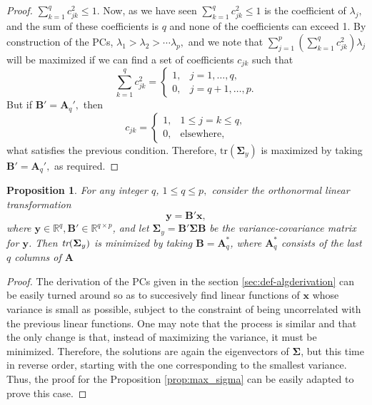 \documentclass[11pt, oneside]{book}
\theoremstyle{plain}
\newtheorem{prop}{Proposition}[section]
\theoremstyle{remark}
\begin{document}
\begin{proof}
    $\sum_{k=1}^qc_{jk}^2\leq 1.$ Now, as we have seen $\sum_{k=1}^qc_{jk}^2\leq
    1$ is the coefficient of $\lambda_j,$ and the sum of these coefficients is
    $q$ and none of the coefficients can exceed 1. By construction of the PCs, 
    $\lambda_1>\lambda_2>\cdots\lambda_p,$ and we note that
    $\sum_{j=1}^p\left(\sum_{k=1}^qc_{jk}^2\right)\lambda_j$ will be maximized
    if we can find a set of coefficients $c_{jk}$ such that
    $$\sum_{k=1}^qc_{jk}^2 = 
    \begin{cases}
        1, & j=1,\dots,q,\\
        0, & j=q+1,\dots,p.
    \end{cases}$$ But if $\mathbf{B'} = \mathbf{A}_q',$ then
    $$c_{jk} =
    \begin{cases}
        1, & 1\leq j=k\leq q,\\
        0, & \text{elsewhere},
    \end{cases}$$ what satisfies the previous condition. Therefore,
    $\text{tr}(\mathbf{\Sigma}_y)$ is maximized by taking $\mathbf{B'} =
    \mathbf{A}_q',$ as required. 
\end{proof}    
\begin{prop}\label{prop:min_sigma}
    For any integer $q$, $1\leq q\leq p,$ consider the orthonormal linear
    transformation $$\mathbf{y} = \mathbf{B'x},$$ where
    $\mathbf{y}\in\mathbb{R}^q, \mathbf{B'}\in\mathbb{R}^{q\times p}$, and let
    $\mathbf{\Sigma}_y = \mathbf{B'\Sigma B}$ be the variance-covariance matrix
    for $\mathbf{y}$. Then $\emph{tr}(\mathbf{\Sigma}_y)$ is minimized by taking
    $\mathbf{B} = \mathbf{A}_q^*$, where $\mathbf{A}_q^*$ consists of the last 
    $q$ columns of $\mathbf{A}$
\end{prop}
\begin{proof}
    The derivation of the PCs given in the section \ref{sec:def-algderivation}
    can be easily turned around so as to succesively find linear functions of
    $\mathbf{x}$ whose variance is small as possible, subject to the constraint
    of being uncorrelated with the previous linear functions. One may note that
    the process is similar and that the only change is that, instead of
    maximizing the variance, it must be minimized. Therefore, the solutions are
    again the eigenvectors of $\mathbf{\Sigma}$, but this time in reverse order,
    starting with the one corresponding to the smallest variance. Thus, the
    proof for the Proposition \ref{prop:max_sigma} can be easily adapted to
    prove this case. 
\end{proof}
\end{document}
